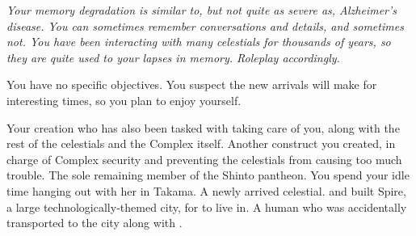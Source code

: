 \documentclass[char]{guardians}
\begin{document}
\emph{Your memory degradation is similar to, but not quite as severe as, Alzheimer's disease. You can sometimes remember conversations and details, and sometimes not. You have been interacting with many celestials for thousands of years, so they are quite used to your lapses in memory. Roleplay accordingly.}

\begin{itemz}[Goals]
  \item You have no specific objectives. You suspect the new arrivals will make for interesting times, so you plan to enjoy yourself.
\end{itemz}


\begin{contacts}
  \contact{\cCaretaker{}} Your creation who has also been tasked with taking care of you, along with the rest of the celestials and the Complex itself.
  \contact{\cWarden{}} Another construct you created, in charge of Complex security and preventing the celestials from causing too much trouble.
  \contact{\cAmaterasu{}} The sole remaining member of the Shinto pantheon. You spend your idle time hanging out with her in Takama.
  \contact{\cUnity{}} A newly arrived celestial. \cWarden{} and \cCaretaker{} built Spire, a large technologically-themed city, for \cUnity{} to live in.
  \contact{\cKachiko{}} A human who was accidentally transported to the city along with \cUnity{}.
\end{contacts}
\end{document}

